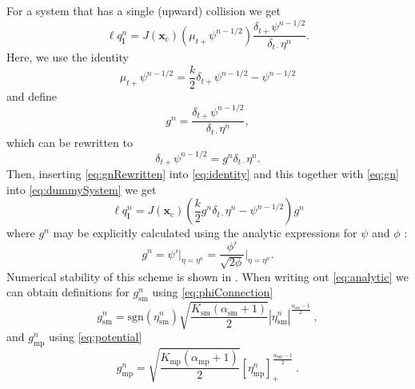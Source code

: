 \documentclass[dvipsnames, pdftex]{article}
\def\ugen{q}
\begin{document}
For a system that has a single (upward) collision we get
\begin{equation}\label{eq:dummySystem}
    \ell \ugen^n_{\boldsymbol{l}} = J(\boldsymbol{x}_\text{c})\left(\mu_{t+}\psi^{n-1/2}\right)\frac{\delta_{t+}\psi^{n-1/2}}{\delta_{t\cdot}\eta^n}.
\end{equation}
Here, we use the identity 
\begin{equation}\label{eq:identity}
    \mu_{t+}\psi^{n-1/2} = \frac{k}{2}\delta_{t+}\psi^{n-1/2}-\psi^{n-1/2}
\end{equation}
and define
\begin{equation}\label{eq:gn}
    g^n = \frac{\delta_{t+}\psi^{n-1/2}}{\delta_{t\cdot}\eta^n},
\end{equation}
which can be rewritten to
\begin{equation}\label{eq:gnRewritten}
    \delta_{t+}\psi^{n-1/2} = g^n\delta_{t\cdot}\eta^n.
\end{equation}
Then, inserting \eqref{eq:gnRewritten} into \eqref{eq:identity} and this together with \eqref{eq:gn} into \eqref{eq:dummySystem} we get
\begin{equation}\label{eq:inserted}
    \ell \ugen^n_{\boldsymbol{l}} = J(\boldsymbol{x}_\text{c})\left(\frac{k}{2}g^n\delta_{t\cdot}\eta^n-\psi^{n-1/2}\right)g^n
\end{equation}
where $g^n$ may be explicitly calculated using the analytic expressions for $\psi$ and $\phi$ \cite{Ducceschi2019}:
\begin{equation}\label{eq:analytic}
    g^n = \psi'\bigg\rvert_{\eta=\eta^n} = \frac{\phi'}{\sqrt{2\phi}}\bigg\rvert_{\eta=\eta^n}.
\end{equation}
Numerical stability of this scheme is shown in \cite{Ducceschi2019}. When writing out \eqref{eq:analytic} we can obtain definitions for $g_\text{sm}^n$ using \eqref{eq:phiConnection}
\begin{equation}\label{eq:gnSM}
    g_\text{sm}^n =\text{sgn}(\eta_\text{sm}^n)\sqrt{\frac{K_\text{sm}(\alpha_\text{sm}+1)}{2}}|\eta_\text{sm}^n|^{\frac{\alpha_\text{sm}-1}{2}}\ ,
\end{equation}
and $g_\text{mp}^n$ using \eqref{eq:potential}
\begin{equation}\label{eq:gnMP}
    g_\text{mp}^n =\sqrt{\frac{K_\text{mp}(\alpha_\text{mp} + 1)}{2}} [\eta_\text{mp}^n]_+^{\frac{\alpha_\text{mp} - 1}{2}}\ .
\end{equation} 
\end{document}
